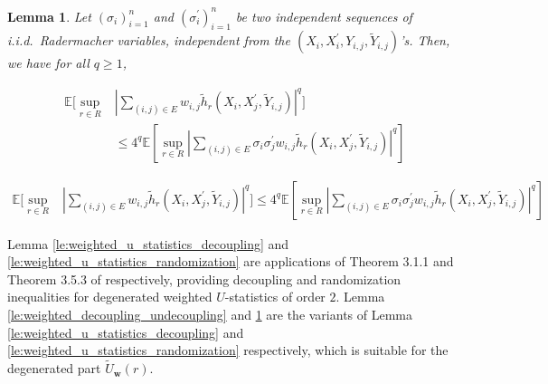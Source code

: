 \documentclass[letterpaper]{article} %
\def\DoubleColumn{}
\def\DoubleColumnEnd{}
\def\SingleColumn{}
\def\SingleColumnEnd{}
\newtheorem{lemma}{Lemma}
\newcommand{\E}{\mathbb{E}}
\newcommand{\weight}{\mathbf{w}}
\newcommand{\pair}[1]{(#1)}
\begin{document}
\begin{lemma}
    \label{le:weighted_randomization}
    Let $(\sigma_i)_{i=1}^n$ and $(\sigma_i^\prime)_{i=1}^n$ be two independent sequences of i.i.d.\ Radermacher variables, independent from the $(X_i,X_i^\prime, Y_{i,j}, \tilde{Y}_{i,j})$'s. Then, we have for all $q\ge 1$,
    \DoubleColumn
    \begin{align*}
        \E[\sup_{r\in R}&|\sum_{\pair{i,j}\in E} w_{i,j}\tilde{h}_r(X_i,X_j^\prime, \tilde{Y}_{i,j})|^q]\\
        &\le 4^q\E[\sup_{r\in R}|\sum_{\pair{i,j}\in E}\sigma_i\sigma_j^\prime w_{i,j}\tilde{h}_r(X_i, X_j^\prime,\tilde{Y}_{i,j})|^q]
    \end{align*}
    \DoubleColumnEnd
    \SingleColumn
    \begin{align*}
        \E[\sup_{r\in R}&|\sum_{\pair{i,j}\in E} w_{i,j}\tilde{h}_r(X_i,X_j^\prime, \tilde{Y}_{i,j})|^q] \le 4^q\E[\sup_{r\in R}|\sum_{\pair{i,j}\in E}\sigma_i\sigma_j^\prime w_{i,j}\tilde{h}_r(X_i, X_j^\prime,\tilde{Y}_{i,j})|^q]
    \end{align*}
    \SingleColumnEnd
\end{lemma}


Lemma \ref{le:weighted_u_statistics_decoupling} and \ref{le:weighted_u_statistics_randomization} are applications of Theorem 3.1.1 and Theorem 3.5.3 of \cite{de2012decoupling} respectively, providing decoupling and randomization inequalities for degenerated weighted $U$-statistics of order $2$. Lemma \ref{le:weighted_decoupling_undecoupling} and \ref{le:weighted_randomization} are the variants of Lemma \ref{le:weighted_u_statistics_decoupling} and \ref{le:weighted_u_statistics_randomization} respectively, which is suitable for the degenerated part $\widetilde{U}_\weight{}(r)$.
\end{document}
